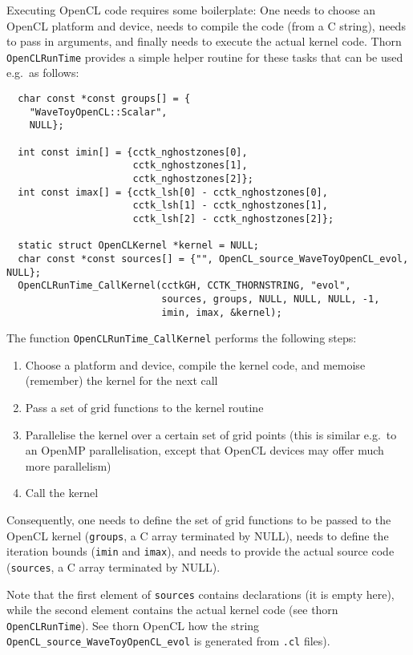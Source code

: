 Executing OpenCL code requires some boilerplate: One needs to choose
an OpenCL platform and device, needs to compile the code (from a
C string), needs to pass in arguments, and finally needs to execute
the actual kernel code. Thorn \texttt{OpenCLRunTime} provides a simple
helper routine for these tasks that can be used e.g.\ as follows:

\begin{verbatim}
  char const *const groups[] = {
    "WaveToyOpenCL::Scalar",
    NULL};
  
  int const imin[] = {cctk_nghostzones[0],
                      cctk_nghostzones[1],
                      cctk_nghostzones[2]};
  int const imax[] = {cctk_lsh[0] - cctk_nghostzones[0],
                      cctk_lsh[1] - cctk_nghostzones[1],
                      cctk_lsh[2] - cctk_nghostzones[2]};
  
  static struct OpenCLKernel *kernel = NULL;
  char const *const sources[] = {"", OpenCL_source_WaveToyOpenCL_evol, NULL};
  OpenCLRunTime_CallKernel(cctkGH, CCTK_THORNSTRING, "evol",
                           sources, groups, NULL, NULL, NULL, -1,
                           imin, imax, &kernel);
\end{verbatim}

The function \texttt{OpenCLRunTime\_CallKernel} performs the following
steps:
\begin{enumerate}
\item Choose a platform and device, compile the kernel code, and
  memoise (remember) the kernel for the next call
\item Pass a set of grid functions to the kernel routine
\item Parallelise the kernel over a certain set of grid points (this
  is similar e.g.\ to an OpenMP parallelisation, except that OpenCL
  devices may offer much more parallelism)
\item Call the kernel
\end{enumerate}
Consequently, one needs to define the set of grid functions to be
passed to the OpenCL kernel (\texttt{groups}, a C array terminated by
NULL), needs to define the iteration bounds (\texttt{imin} and
\texttt{imax}), and needs to provide the actual source code
(\texttt{sources}, a C array terminated by NULL\@).

Note that the first element of \texttt{sources} contains declarations
(it is empty here), while the second element contains the actual
kernel code (see thorn \texttt{OpenCLRunTime}). See thorn OpenCL how
the string \texttt{OpenCL\_source\_WaveToyOpenCL\_evol} is generated
from \texttt{.cl} files).

